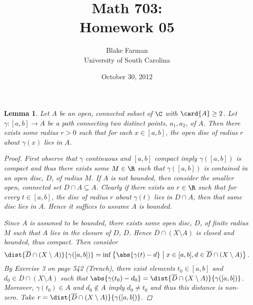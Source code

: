 \documentclass[12pt]{amsart}
\author{Blake Farman\\University of South Carolina}
\title{Math 703:\\Homework 05}
\date{October 30, 2012}
\begin{document}
\maketitle

\newtheorem{setup}{}
\setcounter{setup}{16}
\newtheorem{ex}{}[setup]
\newtheorem{lem}{Lemma}
\theoremstyle{definition}
\newtheorem{defn}{Definition}

\begin{lem}\label{min-radius}
  Let $A$ be an open, connected subset of $\C$ with $\card{A} \geq 2$.
  Let $\gamma \colon [a, b] \rightarrow A$ be a path connecting two distinct points, $a_1, a_2$, of $A$.
  Then there exists some radius $r > 0$ such that for each $x \in [a,b]$, the open disc of radius $r$ about $\gamma(x)$ lies in $A$.
  
  \begin{proof}
    First observe that $\gamma$ continuous and $[a,b]$  compact imply $\gamma([a,b])$ is compact and thus there exists some $M \in \R$ such that $\gamma([a,b])$ is contained in an open disc, $D$, of radius $M$.
    If $A$ is not bounded, then consider the smaller open, connected set $D \cap A \subseteq A$.
    Clearly if there exists an $r \in \R$ such that for every $t \in [a,b]$, the disc of radius $r$ about $\gamma(t)$ lies in $D \cap A$, then that same disc lies in $A$.
    Hence it suffices to assume $A$ is bounded.
    
    Since $A$ is assumed to be bounded, there exists some open disc, $D$, of finite radius $M$ such that $A$ lies in the closure of $D$, $\overline{D}$.
    Hence $\overline{D} \cap (X \setminus A)$ is closed and bounded, thus compact.
    Then consider $$\dist{\overline{D} \cap (X \setminus{A})}{\gamma([a,b])} = \inf \left\{\abs{\gamma(t) - d} \;\middle\vert\; x \in [a,b], d \in \overline{D} \cap (X \setminus{A})\right\}.$$
    By Exercise 3 on page 542 (Trench), there exist elements $t_0 \in [a,b]$ and $d_0 \in \overline{D} \cap (X \setminus{A})$ such that $\abs{\gamma(t_0) - d_0} = \dist{\overline{D} \cap (X \setminus{A})}{\gamma([a,b])}$.
    Moreover, $\gamma(t_0) \in A$ and $d_0 \not \in A$ imply $d_0 \not = t_0$ and thus this distance is non-zero.
    Take $r = \dist{\overline{D} \cap (X \setminus{A})}{\gamma([a,b])}$.
  \end{proof}
\end{lem}
\end{document}
